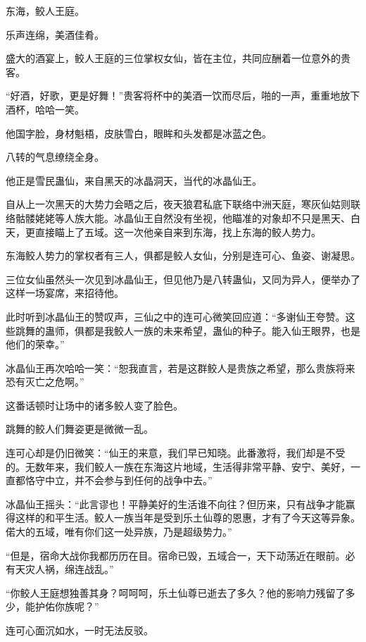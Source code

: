 
\begin{this_body}

东海，鲛人王庭。

乐声连绵，美酒佳肴。

盛大的酒宴上，鲛人王庭的三位掌权女仙，皆在主位，共同应酬着一位意外的贵客。

“好酒，好歌，更是好舞！”贵客将杯中的美酒一饮而尽后，啪的一声，重重地放下酒杯，哈哈一笑。

他国字脸，身材魁梧，皮肤雪白，眼眸和头发都是冰蓝之色。

八转的气息缭绕全身。

他正是雪民蛊仙，来自黑天的冰晶洞天，当代的冰晶仙王。

自从上一次黑天的大势力会晤之后，夜天狼君私底下联络中洲天庭，寒灰仙姑则联络骷髅姥姥等人族大能。冰晶仙王自然没有坐视，他瞄准的对象却不只是黑天、白天，更直接瞄上了五域。这一次他亲自来到东海，找上东海的鲛人势力。

东海鲛人势力的掌权者有三人，俱都是鲛人女仙，分别是连可心、鱼姿、谢凝思。

三位女仙虽然头一次见到冰晶仙王，但见他乃是八转蛊仙，又同为异人，便举办了这样一场宴席，来招待他。

此时听到冰晶仙王的赞叹声，三仙之中的连可心微笑回应道：“多谢仙王夸赞。这些跳舞的蛊师，俱都是我鲛人一族的未来希望，蛊仙的种子。能入仙王眼界，也是他们的荣幸。”

冰晶仙王再次哈哈一笑：“恕我直言，若是这群鲛人是贵族之希望，那么贵族将来恐有灭亡之危啊。”

这番话顿时让场中的诸多鲛人变了脸色。

跳舞的鲛人们舞姿更是微微一乱。

连可心却是仍旧微笑：“仙王的来意，我们早已知晓。此番激将，我们却是不受的。无数年来，我们鲛人一族在东海这片地域，生活得非常平静、安宁、美好，一直都恪守中立，并不会参与到任何的战争中去。”

冰晶仙王摇头：“此言谬也！平静美好的生活谁不向往？但历来，只有战争才能赢得这样的和平生活。鲛人一族当年是受到乐土仙尊的恩惠，才有了今天这等异象。偌大的五域，唯有你们这一处异族，乃是超级势力。”

“但是，宿命大战你我都历历在目。宿命已毁，五域合一，天下动荡近在眼前。必有天灾人祸，绵连战乱。”

“你鲛人王庭想独善其身？呵呵呵，乐土仙尊已逝去了多久？他的影响力残留了多少，能护佑你族呢？”

连可心面沉如水，一时无法反驳。


\end{this_body}
